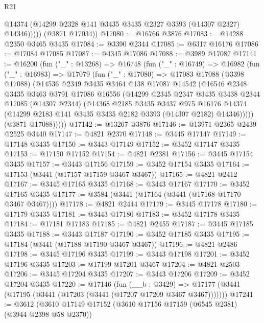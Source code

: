 \begin{lexlean}{R21}
\begin{coremodule}
              @14374
              (@14299 @2328 @141 @3435 @3435 @2327 @3393 (@14307 @2327) @14346)))))
      (@3871 @17034))
@17080 := @16766 @3876
@17083 := @14288 @2350 @3465 @3435
@17084 := @3390 @2344
@17085 := @6317 @16176
@17086 := @17084 @17085
@17087 := @4345 @17086
@17088 := @3989 @17087
@17141 := @16200
    (fun ("_" : @13268) =>
    @16748
      (fun ("_" : @16749) =>
      @16982
        (fun ("_" : @16983) =>
        @17079
          (fun ("_" : @17080) =>
          @17083
            @17088
            (@3398 @17088)
            (@14536
              @2349
              @3435
              @3464
              @138
              @17087
              @14542
              (@16546
                @2348
                @3435
                @3463
                @3791
                @17086
                @16556
                (@14299
                  @2345
                  @2347
                  @3435
                  @3438
                  @2344
                  @17085
                  (@14307 @2344)
                  (@14368
                    @2185
                    @3435
                    @3437
                    @975
                    @16176
                    @14374
                    (@14299 @2183 @141 @3435 @3435 @2182 @3393 (@14307 @2182) @14346)))))
            (@3871 @17088)))))
@17142 := @13267 @3876
@17146 := @13971 @2365 @2439 @2525 @3440
@17147 := @4821 @2370
@17148 := @3445 @17147
@17149 := @17148 @3435
@17150 := @3443 @17149
@17152 := @3452 @17147 @3435
@17153 := @17150 @17152
@17154 := @4821 @2381
@17156 := @3445 @17154 @3435
@17157 := @3443 @17156
@17159 := @3452 @17154 @3435
@17164 := @17153 (@3441 (@17157 @17159 @3467 @3467))
@17165 := @4821 @2412
@17167 := @3445 @17165 @3435
@17168 := @3443 @17167
@17170 := @3452 @17165 @3435
@17177 := @3584 (@3441 (@17164 (@3441 (@17168 @17170 @3467 @3467))))
@17178 := @4821 @2444
@17179 := @3445 @17178
@17180 := @17179 @3435
@17181 := @3443 @17180
@17183 := @3452 @17178 @3435
@17184 := @17181 @17183
@17185 := @4821 @2455
@17187 := @3445 @17185 @3435
@17188 := @3443 @17187
@17190 := @3452 @17185 @3435
@17195 := @17184 (@3441 (@17188 @17190 @3467 @3467))
@17196 := @4821 @2486
@17198 := @3445 @17196 @3435
@17199 := @3443 @17198
@17201 := @3452 @17196 @3435
@17203 := @17199 @17201 @3467
@17204 := @4821 @2503
@17206 := @3445 @17204 @3435
@17207 := @3443 @17206
@17209 := @3452 @17204 @3435
@17220 := @17146
    (fun (__b : @3429) =>
    @17177 (@3441 (@17195 (@3441 (@17203 (@3441 (@17207 @17209 @3467 @3467)))))))
@17241 := @3612
    (@3610
      @17149
      @17152
      (@3610 @17156 @17159 (@6545 @2381) (@3944 @2398 @58 @2370))

\end{coremodule}
\end{lexlean}
